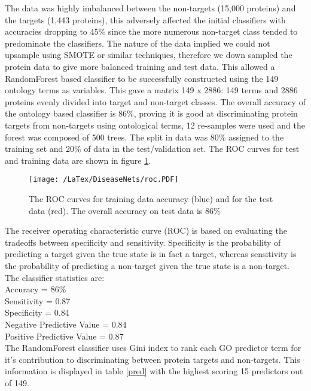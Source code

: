 \documentclass[a4paper,8pt,twocolumn,5p]{elsarticle}
\begin{document}
The data was highly imbalanced between the non-targets (15,000 proteins) and the targets (1,443 proteins), this adversely affected the initial classifiers with accuracies dropping to 45\% since the more numerous non-target class tended to predominate the classifiers. The nature of the data implied we could not upsample using SMOTE or similar techniques, therefore we down sampled the protein data to give more balanced training and test data. This allowed a RandomForest based classifier to be successfully constructed using the 149 ontology terms as variables. This gave a matrix 149 x 2886: 149 terms and 2886 proteins evenly divided into target and non-target classes. The overall accuracy of the ontology based classifier is 86\%, proving it is good at discriminating protein targets from non-targets using ontological terms, 12 re-samples were used and the forest was composed of 500 trees. The split in data was 80\% assigned to the training set and 20\% of data in the test/validation set. The ROC curves for test and training data are shown in figure \ref{roc1}.

\begin{figure}[h]
\centering
\texttt{[image: /LaTex/DiseaseNets/roc.PDF]} %
\centering \caption{The ROC curves for training data accuracy (blue) and for the test data (red). The overall accuracy on test data is 86\%}
\label{roc1}
\end{figure}

The receiver operating characteristic curve (ROC) is based on evaluating the tradeoffs between specificity and sensitivity. Specificity is the probability of predicting a target given the true state is in fact a target, whereas sensitivity is the probability of predicting a non-target given the true state is a non-target. The classifier statistics are:\\

\noindent Accuracy = 86\% \\
Sensitivity = 0.87\\
Specificity = 0.84\\
Negative Predictive Value = 0.84\\
Positive Predictive Value = 0.87\\

The RandomForest classifier uses Gini index to rank each GO predictor term for it's contribution to discriminating between protein targets and non-targets. This information is displayed in table \ref{pred} with the highest scoring 15 predictors out of 149. 
\end{document}
